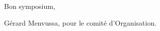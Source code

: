 
\lipsum[1-5]

\begin{flushright}
Bon symposium,

Gérard Menvussa, pour le comit{\'e} d'Organisation.
\end{flushright}

